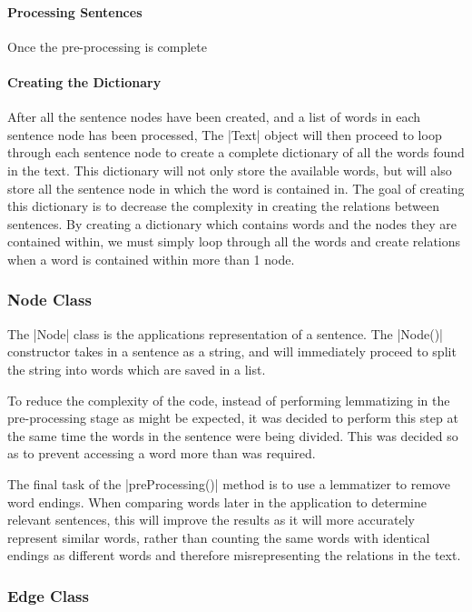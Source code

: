 	\paragraph{Processing Sentences}
		
		Once the pre-processing is complete
	
	\paragraph{Creating the Dictionary}
	
		After all the sentence nodes have been created, and a list of words in each sentence node has been processed, The |Text| object will then proceed to loop through each sentence node to create a complete dictionary of all the words found in the text. This dictionary will not only store the available words, but will also store all the sentence node in which the word is contained in. The goal of creating this dictionary is to decrease the complexity in creating the relations between sentences. By creating a dictionary which contains words and the nodes they are contained within, we must simply loop through all the words and create relations when a word is contained within more than 1 node.
		
	\paragraph{}
	
	\subsubsection{Node Class}
	
		The |Node| class is the applications representation of a sentence. The |Node()| constructor takes in a sentence as a string, and will immediately proceed to split the string into words which are saved in a list. 
		
		To reduce the complexity of the code, instead of performing lemmatizing in the pre-processing stage as might be expected, it was decided to perform this step at the same time the words in the sentence were being divided. This was decided so as to prevent accessing a word more than was required.
		
		The final task of the |preProcessing()| method is to use a lemmatizer to remove word endings. When comparing words later in the application to determine relevant sentences, this will improve the results as it will more accurately represent similar words, rather than counting the same words with identical endings as different words and therefore misrepresenting the relations in the text.
		
	
	\subsubsection{Edge Class}
	
	
	
